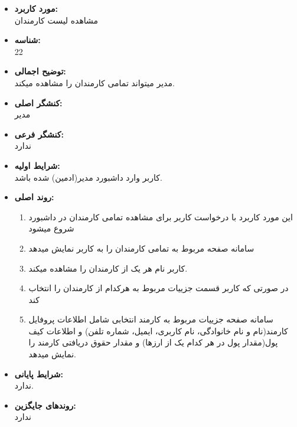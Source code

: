 \documentclass{article}
\begin{document}
\begin{itemize}
\item \textbf{مورد کاربرد:}\\
مشاهده لیست کارمندان
\item \textbf{شناسه:}\\
22
\item \textbf{توضیح اجمالی:}\\
مدیر میتواند تمامی کارمندان را مشاهده میکند.
\item \textbf{کنشگر اصلی:}\\
مدیر
\item \textbf{کنشگر فرعی:}\\
ندارد
\item \textbf{شرایط اولیه:}\\
کاربر وارد داشبورد مدیر(ادمین) شده باشد.
\item \textbf{روند اصلی:}\\
\begin{enumerate}
\item  این مورد کاربرد با درخواست کاربر برای مشاهده تمامی  کارمندان در داشبورد شروع میشود
\item سامانه صفحه مربوط به تمامی کارمندان را به کاربر نمایش میدهد
\item کاربر نام هر یک از کارمندان را مشاهده میکند.
\item  در صورتی که کاربر قسمت جزییات مربوط به هرکدام از کارمندان را انتخاب کند
\item سامانه صفحه جزییات مربوط به کارمند انتخابی شامل اطلاعات پروفایل کارمند(نام و نام خانوادگی، نام کاربری، ایمیل، شماره تلفن) و اطلاعات کیف پول(مقدار پول در هر کدام یک از ارزها) و مقدار حقوق دریافتی کارمند را نمایش میدهد.
\end{enumerate}
\item \textbf{شرایط پایانی:}\\ 
ندارد.
\item \textbf{روندهای جایگزین:}\\
ندارد
\end{itemize}
\noindent\makebox[\linewidth]{\rule{\paperwidth}{0.4pt}}
\end{document}
